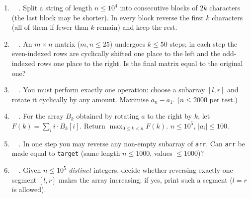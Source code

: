 \exlegend
\begin{enumerate}[leftmargin=*, label=\textbf{E3.\arabic*}, itemsep=6pt]
    \item \exeasy\ \pconcept {}\ . Split a string of length $n \le 10^4$ into consecutive blocks of $2k$ characters (the last block may be shorter). In every block reverse the first $k$ characters (all of them if fewer than $k$ remain) and keep the rest.
    \item \exeasy\ \precent {}\ . An $m \times n$ matrix ($m, n \le 25$) undergoes $k \le 50$ steps; in each step the even-indexed rows are cyclically shifted one place to the left and the odd-indexed rows one place to the right. Is the final matrix equal to the original one?
    \item \exeasy\ \pconcept {}\ . You must perform exactly one operation: choose a subarray $[l, r]$ and rotate it cyclically by any amount. Maximise $a_n - a_1$. ($n \le 2000$ per test.)
    \item \exmedium\ \pclassic {}\ . For the array $B_k$ obtained by rotating $a$ to the right by $k$, let $F(k) = \sum_i i \cdot B_k[i]$. Return $\max_{0 \le k < n} F(k)$. $n \le 10^5$, $|a_i| \le 100$.
    \item \exeasy\ \ptricky {}\ . In one step you may reverse any non-empty subarray of \texttt{arr}. Can \texttt{arr} be made equal to \texttt{target} (same length $n \le 1000$, values $\le 1000$)?
    \item \exmedium\ \ptricky {}\ . Given $n \le 10^5$ \emph{distinct} integers, decide whether reversing exactly one segment $[l, r]$ makes the array increasing; if yes, print such a segment ($l = r$ is allowed).
\end{enumerate}

